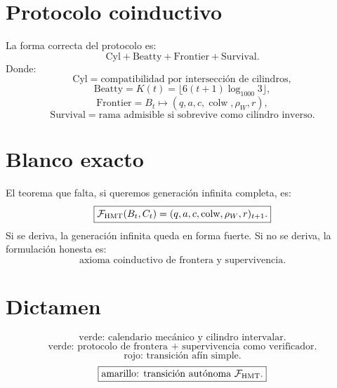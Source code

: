 \documentclass[11pt,a4paper]{article}
\begin{document}
\section{Protocolo coinductivo}

La forma correcta del protocolo es:
\[
\boxed{
\text{Cyl}+\text{Beatty}+\text{Frontier}+\text{Survival}.
}
\]
Donde:
\[
\text{Cyl}=\text{compatibilidad por intersección de cilindros},
\]
\[
\text{Beatty}=K(t)=\lfloor6(t+1)\log_{1000}3\rfloor,
\]
\[
\text{Frontier}=B_t\mapsto(q,a,c,\operatorname{colw},\rho_W,r),
\]
\[
\text{Survival}=\text{rama admisible si sobrevive como cilindro inverso}.
\]

\section{Blanco exacto}

El teorema que falta, si queremos generación infinita completa, es:
\[
\boxed{
\mathcal F_{\rm HMT}(B_t,C_t)
=
(q,a,c,\operatorname{colw},\rho_W,r)_{t+1}.
}
\]
Si se deriva, la generación infinita queda en forma fuerte. Si no se deriva, la formulación honesta es:
\[
\boxed{
\text{axioma coinductivo de frontera y supervivencia.}
}
\]

\section{Dictamen}

\[
\boxed{
\text{verde: calendario mecánico y cilindro intervalar.}
}
\]
\[
\boxed{
\text{verde: protocolo de frontera + supervivencia como verificador.}
}
\]
\[
\boxed{
\text{rojo: transición afín simple.}
}
\]
\[
\boxed{
\text{amarillo: transición autónoma }\mathcal F_{\rm HMT}.
}
\]
\end{document}
